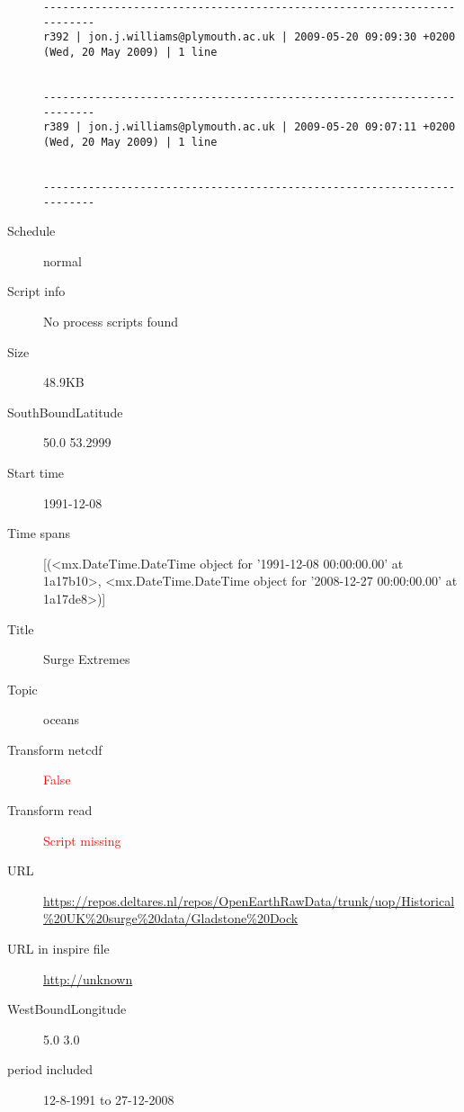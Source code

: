 \documentclass[9]{report}
\begin{document}
\begin{description}
\begin{verbatim}
------------------------------------------------------------------------
r392 | jon.j.williams@plymouth.ac.uk | 2009-05-20 09:09:30 +0200 (Wed, 20 May 2009) | 1 line


------------------------------------------------------------------------
r389 | jon.j.williams@plymouth.ac.uk | 2009-05-20 09:07:11 +0200 (Wed, 20 May 2009) | 1 line


------------------------------------------------------------------------

\end{verbatim}
  \item[Schedule] normal
  \item[Script info] No process scripts found
  \item[Size] 48.9KB
  \item[SouthBoundLatitude] 50.0 53.2999
  \item[Start time] 1991-12-08
  \item[Time spans] [(<mx.DateTime.DateTime object for '1991-12-08 00:00:00.00' at 1a17b10>, <mx.DateTime.DateTime object for '2008-12-27 00:00:00.00' at 1a17de8>)]
  \item[Title]  Surge Extremes 
  \item[Topic] oceans
  \item[Transform netcdf] \textcolor{red}{False}
  \item[Transform read] \textcolor{red}{Script missing}
  \item[URL] \href{https://repos.deltares.nl/repos/OpenEarthRawData/trunk/uop/Historical\%20UK\%20surge\%20data/Gladstone\%20Dock}{https://repos.deltares.nl/repos/OpenEarthRawData/trunk/uop/Historical\%20UK\%20surge\%20data/Gladstone\%20Dock}
  \item[URL in inspire file] \href{http://unknown}{http://unknown}
  \item[WestBoundLongitude] 5.0 3.0
  \item[period included] 12-8-1991 to 27-12-2008
\end{description}
\end{document}
